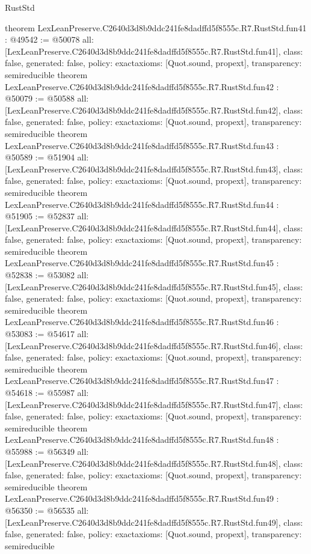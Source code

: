 \begin{lexlean}{RustStd}
\begin{coremodule}
{}
theorem LexLeanPreserve.C2640d3d8b9ddc241fe8dadffd5f8555c.R7.RustStd.fun41 : @49542 := @50078 {
  all: [LexLeanPreserve.C2640d3d8b9ddc241fe8dadffd5f8555c.R7.RustStd.fun41],
  class: false,
  generated: false,
  policy: exact{axioms: [Quot.sound, propext]},
  transparency: semireducible
}
theorem LexLeanPreserve.C2640d3d8b9ddc241fe8dadffd5f8555c.R7.RustStd.fun42 : @50079 := @50588 {
  all: [LexLeanPreserve.C2640d3d8b9ddc241fe8dadffd5f8555c.R7.RustStd.fun42],
  class: false,
  generated: false,
  policy: exact{axioms: [Quot.sound, propext]},
  transparency: semireducible
}
theorem LexLeanPreserve.C2640d3d8b9ddc241fe8dadffd5f8555c.R7.RustStd.fun43 : @50589 := @51904 {
  all: [LexLeanPreserve.C2640d3d8b9ddc241fe8dadffd5f8555c.R7.RustStd.fun43],
  class: false,
  generated: false,
  policy: exact{axioms: [Quot.sound, propext]},
  transparency: semireducible
}
theorem LexLeanPreserve.C2640d3d8b9ddc241fe8dadffd5f8555c.R7.RustStd.fun44 : @51905 := @52837 {
  all: [LexLeanPreserve.C2640d3d8b9ddc241fe8dadffd5f8555c.R7.RustStd.fun44],
  class: false,
  generated: false,
  policy: exact{axioms: [Quot.sound, propext]},
  transparency: semireducible
}
theorem LexLeanPreserve.C2640d3d8b9ddc241fe8dadffd5f8555c.R7.RustStd.fun45 : @52838 := @53082 {
  all: [LexLeanPreserve.C2640d3d8b9ddc241fe8dadffd5f8555c.R7.RustStd.fun45],
  class: false,
  generated: false,
  policy: exact{axioms: [Quot.sound, propext]},
  transparency: semireducible
}
theorem LexLeanPreserve.C2640d3d8b9ddc241fe8dadffd5f8555c.R7.RustStd.fun46 : @53083 := @54617 {
  all: [LexLeanPreserve.C2640d3d8b9ddc241fe8dadffd5f8555c.R7.RustStd.fun46],
  class: false,
  generated: false,
  policy: exact{axioms: [Quot.sound, propext]},
  transparency: semireducible
}
theorem LexLeanPreserve.C2640d3d8b9ddc241fe8dadffd5f8555c.R7.RustStd.fun47 : @54618 := @55987 {
  all: [LexLeanPreserve.C2640d3d8b9ddc241fe8dadffd5f8555c.R7.RustStd.fun47],
  class: false,
  generated: false,
  policy: exact{axioms: [Quot.sound, propext]},
  transparency: semireducible
}
theorem LexLeanPreserve.C2640d3d8b9ddc241fe8dadffd5f8555c.R7.RustStd.fun48 : @55988 := @56349 {
  all: [LexLeanPreserve.C2640d3d8b9ddc241fe8dadffd5f8555c.R7.RustStd.fun48],
  class: false,
  generated: false,
  policy: exact{axioms: [Quot.sound, propext]},
  transparency: semireducible
}
theorem LexLeanPreserve.C2640d3d8b9ddc241fe8dadffd5f8555c.R7.RustStd.fun49 : @56350 := @56535 {
  all: [LexLeanPreserve.C2640d3d8b9ddc241fe8dadffd5f8555c.R7.RustStd.fun49],
  class: false,
  generated: false,
  policy: exact{axioms: [Quot.sound, propext]},
  transparency: semireducible
}
\end{coremodule}
\end{lexlean}
